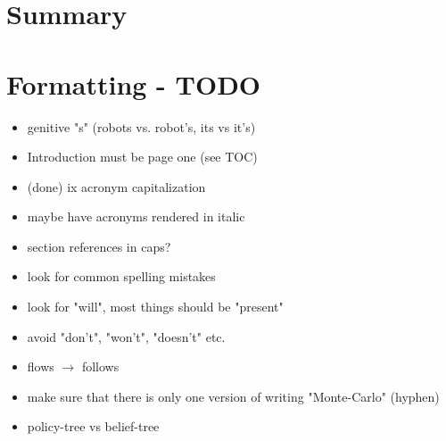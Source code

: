 \chapter{Summary}



\chapter{Formatting - TODO}

\begin{itemize}
  \item genitive "s" (robots vs. robot's, its vs it's)
  \item Introduction must be page one (see TOC)
  \item (done) ix acronym capitalization
  \item maybe have acronyms rendered in italic
  \item section references in caps?
  \item look for common spelling mistakes
  \item look for "will", most things should be "present"
  \item avoid "don't", "won't", "doesn't" etc.\
  \item flows $\to$ follows
  \item make sure that there is only one version of writing "Monte-Carlo" (hyphen)
  \item policy-tree vs belief-tree
\end{itemize}
